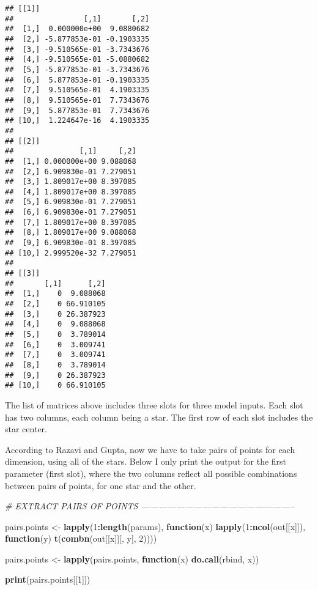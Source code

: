\documentclass[11pt,]{article}
\newenvironment{Shaded}{\begin{snugshade}}{\end{snugshade}}
\newcommand{\CommentTok}[1]{\textcolor[rgb]{0.56,0.35,0.01}{\textit{#1}}}
\newcommand{\ControlFlowTok}[1]{\textcolor[rgb]{0.13,0.29,0.53}{\textbf{#1}}}
\newcommand{\DecValTok}[1]{\textcolor[rgb]{0.00,0.00,0.81}{#1}}
\newcommand{\KeywordTok}[1]{\textcolor[rgb]{0.13,0.29,0.53}{\textbf{#1}}}
\newcommand{\NormalTok}[1]{#1}
\newcommand{\OperatorTok}[1]{\textcolor[rgb]{0.81,0.36,0.00}{\textbf{#1}}}
\newcommand{\StringTok}[1]{\textcolor[rgb]{0.31,0.60,0.02}{#1}}
\begin{document}
\begin{verbatim}
## [[1]]
##                [,1]       [,2]
##  [1,]  0.000000e+00  9.0880682
##  [2,] -5.877853e-01 -0.1903335
##  [3,] -9.510565e-01 -3.7343676
##  [4,] -9.510565e-01 -5.0880682
##  [5,] -5.877853e-01 -3.7343676
##  [6,]  5.877853e-01 -0.1903335
##  [7,]  9.510565e-01  4.1903335
##  [8,]  9.510565e-01  7.7343676
##  [9,]  5.877853e-01  7.7343676
## [10,]  1.224647e-16  4.1903335
## 
## [[2]]
##               [,1]     [,2]
##  [1,] 0.000000e+00 9.088068
##  [2,] 6.909830e-01 7.279051
##  [3,] 1.809017e+00 8.397085
##  [4,] 1.809017e+00 8.397085
##  [5,] 6.909830e-01 7.279051
##  [6,] 6.909830e-01 7.279051
##  [7,] 1.809017e+00 8.397085
##  [8,] 1.809017e+00 9.088068
##  [9,] 6.909830e-01 8.397085
## [10,] 2.999520e-32 7.279051
## 
## [[3]]
##       [,1]      [,2]
##  [1,]    0  9.088068
##  [2,]    0 66.910105
##  [3,]    0 26.387923
##  [4,]    0  9.088068
##  [5,]    0  3.789014
##  [6,]    0  3.009741
##  [7,]    0  3.009741
##  [8,]    0  3.789014
##  [9,]    0 26.387923
## [10,]    0 66.910105
\end{verbatim}

The list of matrices above includes three slots for three model inputs.
Each slot has two columns, each column being a star. The first row of
each slot includes the star center.

According to Razavi and Gupta, now we have to take pairs of points for
each dimension, using all of the stars. Below I only print the output
for the first parameter (first slot), where the two columns reflect all
possible combinations between pairs of points, for one star and the
other.

\begin{Shaded}
\begin{Highlighting}[]
\CommentTok{# EXTRACT PAIRS OF POINTS -----------------------------------------------------}

\NormalTok{pairs.points <-}\StringTok{ }\KeywordTok{lapply}\NormalTok{(}\DecValTok{1}\OperatorTok{:}\KeywordTok{length}\NormalTok{(params), }\ControlFlowTok{function}\NormalTok{(x) }
  \KeywordTok{lapply}\NormalTok{(}\DecValTok{1}\OperatorTok{:}\KeywordTok{ncol}\NormalTok{(out[[x]]), }\ControlFlowTok{function}\NormalTok{(y) }
    \KeywordTok{t}\NormalTok{(}\KeywordTok{combn}\NormalTok{(out[[x]][, y], }\DecValTok{2}\NormalTok{))))}

\NormalTok{pairs.points <-}\StringTok{ }\KeywordTok{lapply}\NormalTok{(pairs.points, }\ControlFlowTok{function}\NormalTok{(x) }\KeywordTok{do.call}\NormalTok{(rbind, x))}

\KeywordTok{print}\NormalTok{(pairs.points[[}\DecValTok{1}\NormalTok{]])}
\end{Highlighting}
\end{Shaded}
\end{document}
